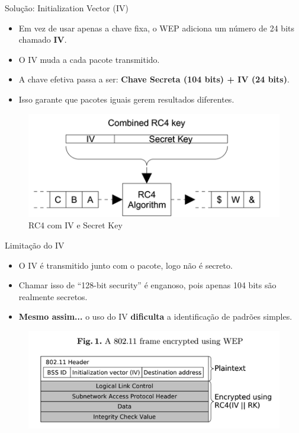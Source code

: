 \begin{frame}{Solução: Initialization Vector (IV)}
    \begin{itemize}
        \item Em vez de usar apenas a chave fixa, o WEP adiciona um número de 24 bits chamado \textbf{IV}.
        \item O IV muda a cada pacote transmitido.
        \item A chave efetiva passa a ser: \textbf{Chave Secreta (104 bits) + IV (24 bits)}.
        \item Isso garante que pacotes iguais gerem resultados diferentes.
    \end{itemize}

\begin{figure}
    \centering
    \includegraphics[width=0.55\linewidth]{Figuras/wep-iv-secret-key.png}
    \caption{RC4 com IV e Secret Key}
\end{figure}
\end{frame}

\begin{frame}{Limitação do IV}
    \begin{itemize}
        \item O IV é transmitido junto com o pacote, logo não é secreto.
        \item Chamar isso de “128-bit security” é enganoso, pois apenas 104 bits são realmente secretos.
        \item \textbf{Mesmo assim...} o uso do IV \textbf{dificulta} a identificação de padrões simples.
    \end{itemize}

\begin{figure}
    \centering
    \includegraphics[width=0.9\linewidth]{Figuras/frame-encrypted-using-wep.png}

\end{figure}

\end{frame}

